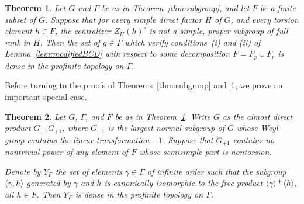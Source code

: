 \documentclass{amsart}
\theoremstyle{plain}
\newtheorem{theorem}{Theorem}[section]
\theoremstyle{definition}
\theoremstyle{remark}
\begin{document}
\begin{theorem}\label{thm:profinitedensity}
Let $G$ and $\Gamma$ be as in Theorem~\ref{thm:subgroup}, and let $F$ be a finite subset
of $G$. Suppose that for every simple direct factor $H$ of $G$, and every torsion
element $h \in F$, the centralizer $Z_{H}(h)^{\circ}$ is not a simple, proper subgroup of
full rank in $H$. Then the set of $g \in
\Gamma$ which verify conditions~(i) and (ii) of
Lemma~\ref{lem:modifiedBCD} with respect to some
decomposition $F = F_{p} \cup F_{r}$ is dense in the profinite topology on $\Gamma$.
\end{theorem}
\noindent Before turning to the proofs of Theorems~\ref{thm:subgroup} and~\ref{thm:profinitedensity},
we prove an important special case.
\begin{theorem}\label{thm:zariski-densePPPs}
Let $G$, $\Gamma$, and $F$ be as in Theorem~\ref{thm:profinitedensity}.
Write $G$ as the almost direct product $G_{-1}G_{+1}$,
where $G_{-1}$ is the largest normal subgroup of $G$ whose Weyl group contains the
linear transformation $-1$. Suppose that $G_{+1}$ contains no
nontrivial power of any element of $F$ whose semisimple part is nontorsion.

Denote by $Y_{F}$ the set of elements $\gamma \in \Gamma$ of
infinite order such that the subgroup
$\langle \gamma, h\rangle$ generated by $\gamma$ and $h$ is canonically isomorphic to the
free product
$\langle \gamma \rangle * \langle h\rangle$, all $h \in F$. Then $Y_{F}$ is dense in the
profinite topology on $\Gamma$.
\end{theorem}
\end{document}
